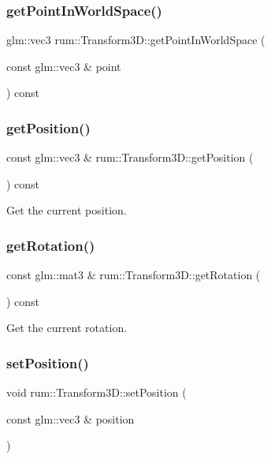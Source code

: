 \subsubsection{\texorpdfstring{get\+Point\+In\+World\+Space()}{getPointInWorldSpace()}}
{\footnotesize\ttfamily glm\+::vec3 rum\+::\+Transform3\+D\+::get\+Point\+In\+World\+Space (\begin{DoxyParamCaption}\item[{const glm\+::vec3 \&}]{point }\end{DoxyParamCaption}) const}

\mbox{\label{classrum_1_1_transform3_d_ad1f62815d81f803b817b722a13bd6c85}} 
\subsubsection{\texorpdfstring{get\+Position()}{getPosition()}}
{\footnotesize\ttfamily const glm\+::vec3 \& rum\+::\+Transform3\+D\+::get\+Position (\begin{DoxyParamCaption}{ }\end{DoxyParamCaption}) const}

Get the current position. \mbox{\label{classrum_1_1_transform3_d_a56a0a2d52f2aa82d1fad1eba49455168}} 
\subsubsection{\texorpdfstring{get\+Rotation()}{getRotation()}}
{\footnotesize\ttfamily const glm\+::mat3 \& rum\+::\+Transform3\+D\+::get\+Rotation (\begin{DoxyParamCaption}{ }\end{DoxyParamCaption}) const}

Get the current rotation. \mbox{\label{classrum_1_1_transform3_d_a1ce0f89805e626b178139c58367b2112}} 
\subsubsection{\texorpdfstring{set\+Position()}{setPosition()}\hspace{0.1cm}{\footnotesize\ttfamily [1/2]}}
{\footnotesize\ttfamily void rum\+::\+Transform3\+D\+::set\+Position (\begin{DoxyParamCaption}\item[{const glm\+::vec3 \&}]{position }\end{DoxyParamCaption})}

